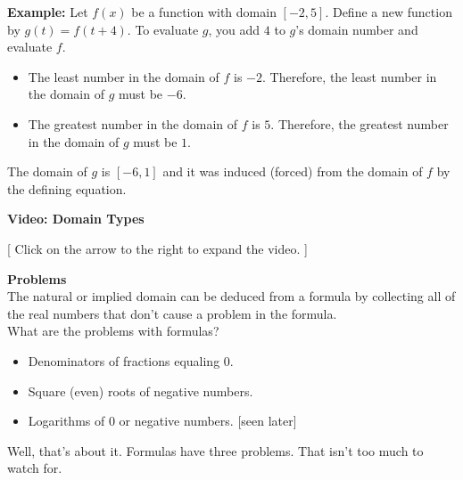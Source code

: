 \documentclass{ximera}
\begin{document}
\begin{enumerate}
\textbf{Example:}  Let $f(x)$ be a function with domain $[-2, 5]$.  Define a new function by $g(t) = f(t+4)$.  To evaluate $g$, you add $4$ to $g$'s domain number and evaluate $f$.  

\begin{itemize}
\item The least number in the domain of $f$ is $-2$.  Therefore, the least number in the domain of $g$ must be $-6$.
\item The greatest number in the domain of $f$ is $5$.  Therefore, the greatest number in the domain of $g$ must be $1$.
\end{itemize} 

The domain of $g$ is $[-6, 1]$ and it was induced (forced) from the domain of $f$ by the defining equation.


\end{enumerate}





\begin{explanation} \textbf{Video: Domain Types}

[ Click on the arrow to the right to expand the video. ]
\begin{expandable} 

\begin{center}
\end{center}

\end{expandable}
\end{explanation}







\begin{warning} \textbf{\textcolor{red!90!darkgray}{Problems}}   \\

The natural or implied domain can be deduced from a formula by collecting all of the real numbers that don't cause a problem in the formula. \\

What are the problems with formulas?

\begin{itemize}
\item  Denominators of fractions equaling $0$. \\
\item  Square (even) roots of negative numbers.    \\
\item  Logarithms of $0$ or negative numbers.  [seen later] 
\end{itemize}

Well, that's about it.  Formulas have three problems.  That isn't too much to watch for.


\end{warning}
\end{document}
